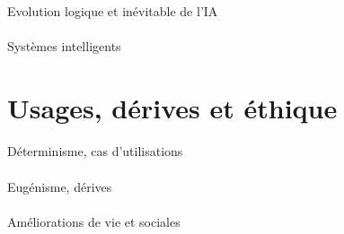 \paragraph{} Evolution logique et inévitable de l'IA 
\paragraph{} Systèmes intelligents

\section{Usages, dérives et éthique}
\paragraph{} Déterminisme, cas d'utilisations
\paragraph{} Eugénisme, dérives
\paragraph{} Améliorations de vie et sociales
